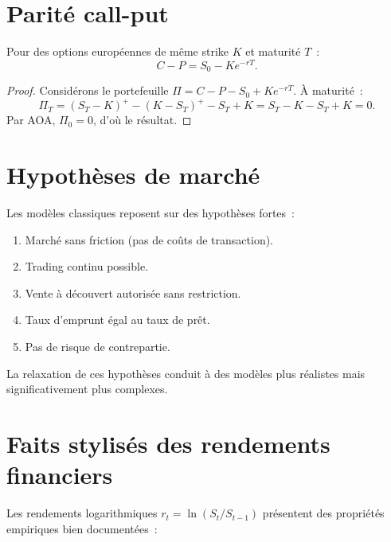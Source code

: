 \section{Parit\'e call-put}

\begin{theoreme}
Pour des options europ\'eennes de m\^eme strike $K$ et maturit\'e $T$~:
\[
    C - P = S_0 - K e^{-rT}.
\]
\end{theoreme}

\begin{proof}
Consid\'erons le portefeuille $\Pi = C - P - S_0 + Ke^{-rT}$. \`A maturit\'e~:
\[
    \Pi_T = (S_T - K)^+ - (K - S_T)^+ - S_T + K = S_T - K - S_T + K = 0.
\]
Par AOA, $\Pi_0 = 0$, d'o\`u le r\'esultat.
\end{proof}

\section{Hypoth\`eses de march\'e}

\begin{attention}[title=\textbf{Hypoth\`eses simplificatrices}]
Les mod\`eles classiques reposent sur des hypoth\`eses fortes~:
\begin{enumerate}
    \item March\'e sans friction (pas de co\^uts de transaction).
    \item Trading continu possible.
    \item Vente \`a d\'ecouvert autoris\'ee sans restriction.
    \item Taux d'emprunt \'egal au taux de pr\^et.
    \item Pas de risque de contrepartie.
\end{enumerate}
La relaxation de ces hypoth\`eses conduit \`a des mod\`eles plus r\'ealistes
mais significativement plus complexes.
\end{attention}

\section{Faits stylis\'es des rendements financiers}

Les rendements logarithmiques $r_t = \ln(S_t/S_{t-1})$ pr\'esentent
des propri\'et\'es empiriques bien document\'ees~:

